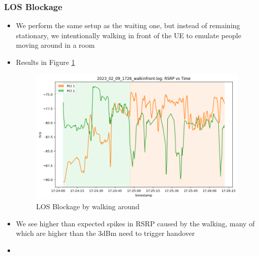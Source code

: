 \subsubsection{LOS Blockage}
\begin{itemize}
    \item We perform the same setup as the waiting one, but instead of remaining stationary, we intentionally walking in front of the UE to emulate people moving around in a room
    \item Results in Figure \ref{fig:methods:2024-02-09-walking}
\begin{figure}
    \centering
    \includegraphics[width=0.75\linewidth]{src//img/2024_02_09_los_block.png}
    \caption{LOS Blockage by walking around}
    \label{fig:methods:2024-02-09-walking}
\end{figure}

\item We see higher than expected spikes in RSRP caused by the walking, many of which are higher than the 3dBm need to trigger handover
\item \end{itemize}


